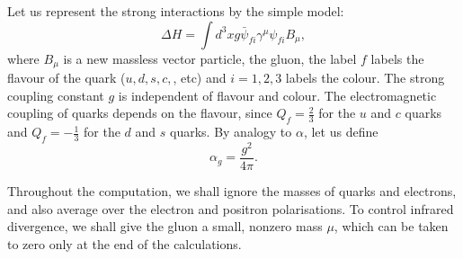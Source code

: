 \documentclass[11pt]{article}
\theoremstyle{definition}
\begin{document}
Let us represent the strong interactions by the simple model:
\begin{equation}
    \Delta H = \int d^3x g \bar{\psi}_{fi} \gamma^\mu \psi_{fi} B_\mu,
\end{equation}
where $B_\mu$ is a new massless vector particle, the gluon, the label $f$ labels the flavour of the quark ($u,d,s,c,$, etc) and $i=1,2,3$ labels the colour. The strong coupling constant $g$ is independent of flavour and colour. The electromagnetic coupling of quarks depends on the flavour, since $Q_f = \frac{2}{3}$ for the $u$ and $c$ quarks and $Q_f = -\frac{1}{3}$ for the $d$ and $s$ quarks. By analogy to $\alpha$, let us define 
\begin{equation}
    \alpha_g = \frac{g^2}{4\pi}.
\end{equation}


Throughout the computation, we shall ignore the masses of quarks and electrons, and also average over the electron and positron polarisations. To control infrared divergence, we shall give the gluon a small, nonzero mass $\mu$, which can be taken to zero only at the end of the calculations. 
\end{document}
